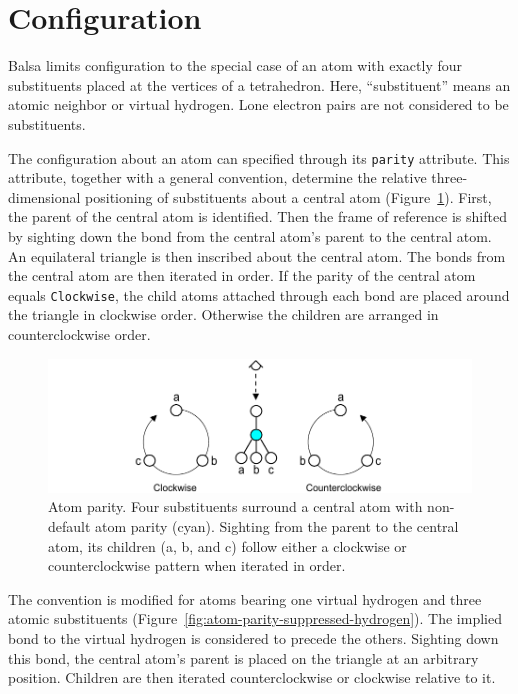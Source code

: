 \documentclass{article}
\def\ttt{\texttt}
\begin{document}
\section*{Configuration}
\label{configuration}

Balsa limits configuration to the special case of an atom with exactly four substituents placed at the vertices of a tetrahedron. Here, \enquote{substituent} means an atomic neighbor or virtual hydrogen. Lone electron pairs are not considered to be substituents.

The configuration about an atom can specified through its \ttt{parity} attribute. This attribute, together with a general convention, determine the relative three-dimensional positioning of substituents about a central atom (Figure~\ref{fig:atom-parity}). First, the parent of the central atom is identified. Then the frame of reference is shifted by sighting down the bond from the central atom's parent to the central atom. An equilateral triangle is then inscribed about the central atom. The bonds from the central atom are then iterated in order. If the parity of the central atom equals \ttt{Clockwise}, the child atoms attached through each bond are placed around the triangle in clockwise order. Otherwise the children are arranged in counterclockwise order.

\begin{figure}
    \centering
    \includegraphics[width=\columnwidth]{atom-parity.pdf}
    \caption{Atom parity. Four substituents surround a central atom with non-default atom parity (cyan). Sighting from the parent to the central atom, its children (a, b, and c) follow either a clockwise or counterclockwise pattern when iterated in order.}
    \label{fig:atom-parity}
\end{figure}

The convention is modified for atoms bearing one virtual hydrogen and three atomic substituents (Figure~\ref{fig:atom-parity-suppressed-hydrogen}). The implied bond to the virtual hydrogen is considered to precede the others. Sighting down this bond, the central atom's parent is placed on the triangle at an arbitrary position. Children are then iterated counterclockwise or clockwise relative to it.
\end{document}
